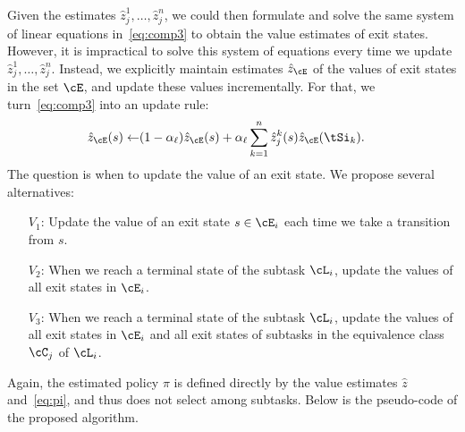 Given the estimates $\hat{z}_j^1,\ldots,\hat{z}_j^n$, we could then formulate and solve the same system of linear equations in~\eqref{eq:comp3} to obtain the value estimates of exit states. However, it is impractical to solve this system of equations every time we update %
$\hat{z}_j^1,\ldots,\hat{z}_j^n$. Instead, we explicitly maintain estimates $\hat{z}_\cE$ of the values of exit states in the set $\cE$, and update these values incrementally. 
For that, we turn~\eqref{eq:comp3} into an update rule:
\begin{align}\label{eq:comprule}
\hat{z}_\cE(s) \leftarrow &(1 - \alpha_\ell) \hat{z}_\cE(s) + \alpha_\ell \sum_{k=1}^n \hat{z}_j^k(s) \hat{z}_\cE(\tSi_k).
\end{align}
The question is when to update the value of an exit state. We propose several alternatives:
\begin{itemize}
\item[$V_1$:] Update the value of an exit state $s\in\cE_i$ each time we take a transition from $s$.
\item[$V_2$:] When we reach a terminal state of the subtask $\cL_i$, update the values of all exit states in $\cE_i$.
\item[$V_3$:] When we reach a terminal state of the subtask $\cL_i$, update the values of all exit states in $\cE_i$ and all exit states of subtasks in the equivalence class $\cC_j$ of $\cL_i$.
\end{itemize}
Again, the estimated policy $\pi$ is defined directly by the value estimates $\hat{z}$ and~\eqref{eq:pi}, and thus does not select among subtasks. Below is the pseudo-code of the proposed algorithm.



